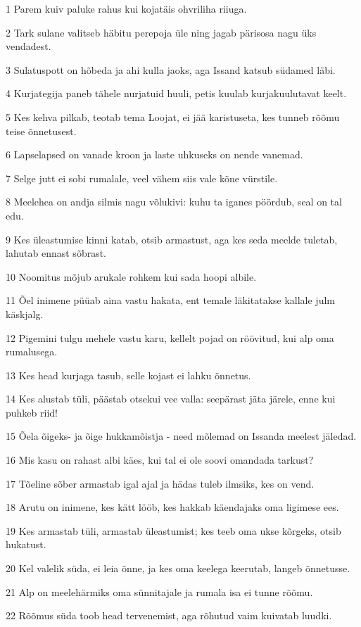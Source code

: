 \par 1 Parem kuiv paluke rahus kui kojatäis ohvriliha riiuga.
\par 2 Tark sulane valitseb häbitu perepoja üle ning jagab pärisosa nagu üks vendadest.
\par 3 Sulatuspott on hõbeda ja ahi kulla jaoks, aga Issand katsub südamed läbi.
\par 4 Kurjategija paneb tähele nurjatuid huuli, petis kuulab kurjakuulutavat keelt.
\par 5 Kes kehva pilkab, teotab tema Loojat, ei jää karistuseta, kes tunneb rõõmu teise õnnetusest.
\par 6 Lapselapsed on vanade kroon ja laste uhkuseks on nende vanemad.
\par 7 Selge jutt ei sobi rumalale, veel vähem siis vale kõne vürstile.
\par 8 Meelehea on andja silmis nagu võlukivi: kuhu ta iganes pöördub, seal on tal edu.
\par 9 Kes üleastumise kinni katab, otsib armastust, aga kes seda meelde tuletab, lahutab ennast sõbrast.
\par 10 Noomitus mõjub arukale rohkem kui sada hoopi albile.
\par 11 Õel inimene püüab aina vastu hakata, ent temale läkitatakse kallale julm käskjalg.
\par 12 Pigemini tulgu mehele vastu karu, kellelt pojad on röövitud, kui alp oma rumalusega.
\par 13 Kes head kurjaga tasub, selle kojast ei lahku õnnetus.
\par 14 Kes alustab tüli, päästab otsekui vee valla: seepärast jäta järele, enne kui puhkeb riid!
\par 15 Õela õigeks- ja õige hukkamõistja - need mõlemad on Issanda meelest jäledad.
\par 16 Mis kasu on rahast albi käes, kui tal ei ole soovi omandada tarkust?
\par 17 Tõeline sõber armastab igal ajal ja hädas tuleb ilmsiks, kes on vend.
\par 18 Arutu on inimene, kes kätt lööb, kes hakkab käendajaks oma ligimese ees.
\par 19 Kes armastab tüli, armastab üleastumist; kes teeb oma ukse kõrgeks, otsib hukatust.
\par 20 Kel valelik süda, ei leia õnne, ja kes oma keelega keerutab, langeb õnnetusse.
\par 21 Alp on meelehärmiks oma sünnitajale ja rumala isa ei tunne rõõmu.
\par 22 Rõõmus süda toob head tervenemist, aga rõhutud vaim kuivatab luudki.
